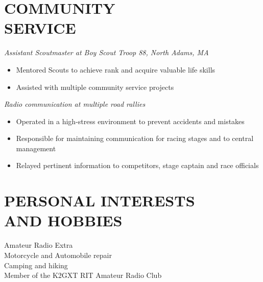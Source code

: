 \documentclass[line,margin]{res}
\begin{document}
\begin{resume}
\section{COMMUNITY \\ SERVICE}  
{\sl	Assistant Scoutmaster at Boy Scout Troop 88, North Adams, MA}
	\begin{itemize}  \itemsep -2pt %
		\item Mentored Scouts to achieve rank and acquire valuable life skills%
		\item Assisted with multiple community service projects
	\end{itemize}
	\vspace{-5pt}
	{\sl	Radio communication at multiple road rallies}
	\begin{itemize}  \itemsep -2pt %
		\item Operated in a high-stress environment to prevent accidents and mistakes		
		\item Responsible for maintaining communication for racing stages and to central management
		\item Relayed pertinent information to competitors, stage captain and race officials
	\end{itemize}

\section{PERSONAL INTERESTS \\ AND HOBBIES}             
	Amateur Radio Extra\\
	Motorcycle and Automobile repair\\
	Camping and hiking\\
	Member of the K2GXT RIT Amateur Radio Club\\


\end{resume}
\end{document}
